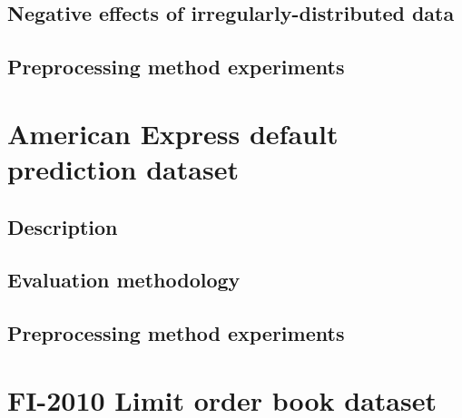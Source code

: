 \documentclass{statsmsc}
\begin{document}
{%

\subsection{Negative effects of irregularly-distributed data}%
\label{sub:Negative effects of irregularly-distributed data}



\subsection{Preprocessing method experiments}%
\label{sub:Preprocessing method experiments}




\section{American Express default prediction dataset}%
\label{sec:American Express default prediction dataset}%

\subsection{Description}%
\label{sub:Description}


\subsection{Evaluation methodology}%
\label{sec:amex_meth}


\subsection{Preprocessing method experiments}%
\label{sub:Preprocessing method experiments}




\section{FI-2010 Limit order book dataset}%
\label{sec:American Express default prediction dataset}%

}
\end{document}
